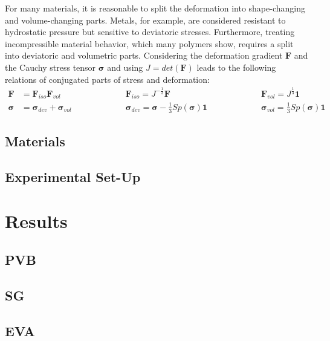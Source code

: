 \documentclass[preprint,12pt,authoryear]{elsarticle}
\begin{document}
For many materials, it is reasonable to split the deformation into shape-changing and volume-changing parts. Metals, for example, are considered resistant to hydrostatic pressure but sensitive to deviatoric stresses. Furthermore, treating incompressible material behavior, which many polymers show, requires a split into deviatoric and volumetric parts. Considering the deformation gradient $\mathbf{F}$ and the Cauchy stress tensor $\boldsymbol{\sigma}$ and using $J=det(\mathbf{F})$ leads to the following relations of conjugated parts of stress and deformation:
\begin{align}
	\label{eq.: split of deformation gradient}
	\mathbf{F}&=\mathbf{F}_{iso}\mathbf{F}_{vol}&\hspace{2cm}&\mathbf{F}_{iso}=J^{-\frac{1}{3}}\mathbf{F}&\hspace{2cm}&\mathbf{F}_{vol}=J^{\frac{1}{3}}\mathbf{1}\\
	\boldsymbol{\sigma}&=\boldsymbol{\sigma}_{dev}+\boldsymbol{\sigma}_{vol}&\hspace{2cm}&\boldsymbol{\sigma}_{dev}=\boldsymbol{\sigma}-\frac{1}{3}Sp(\boldsymbol{\sigma})\mathbf{1}&\hspace{2cm}&\boldsymbol{\sigma}_{vol}=\frac{1}{3}Sp(\boldsymbol{\sigma})\mathbf{1}
\end{align}

\subsection{Materials}
\label{subsec2.2}

\subsection{Experimental Set-Up}
\label{subsec2.3}

\section{Results}
\label{sec3}

\subsection{PVB}
\label{subsec3.1}

\subsection{SG}
\label{subsec3.2}

\subsection{EVA}
\label{subsec3.3}
\end{document}

